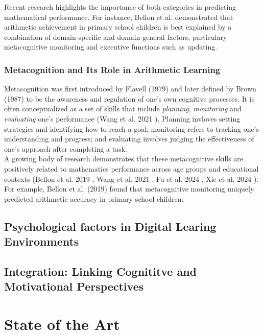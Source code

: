 Recent research highlights the importance of both categories in predicting mathematical performance.
For instance, Bellon et al. \cite{bellon_more_2019} demonstrated that arithmetic achievement in primary school children is best explained by a combination of domain-specific and domain-general factors, particulary metacognitive monitoring and executive functions such as updating. 

\subsubsection{Metacognition and Its Role in Arithmetic Learning}
Metacognition was first introduced by Flavell (1979) \cite{flavell_metacognition_1979} and later defined by Brown (1987) \cite{brown_metacognition_1987} to be the awareness and regulation of one's own cognitive processes.
It is often conceptualized as a set of skills that include \textit{planning}, \textit{monitoring} and \textit{evaluating} one's performance (Wang et al. 2021 \cite{wang_skill_2021}).
Planning invloves setting strategies and identifying how to reach a goal; monitoring refers to tracking one's understanding and progress; and evaluating involves judging the effectiveness of one's approach after completing a task.\\

A growing body of research demonstrates that these metacognitive skills are positively related to mathematics performance across age groups and educational contexts (Bellon et al. 2019 \cite{bellon_more_2019}, Wang et al. 2021 \cite{wang_skill_2021}, Fu et al. 2024 \cite{fu_relationship_2025}, Xie et al. 2024 \cite{xie_meta_2024}).
For example, Bellon et al. (2019) \cite{bellon_more_2019} found that metacognitive monitoring uniquely predicted arithmetic accuracy in primary school children.






\subsection{Psychological factors in Digital Learing Environments}
\subsection{Integration: Linking Cognititve and Motivational Perspectives}
\section{State of the Art}

\